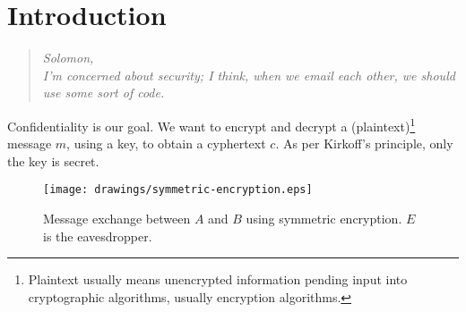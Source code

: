 \chapter{Introduction}

\begin{quote}
	\textit{Solomon,\\ I'm concerned about security; I think, when we email each other, we should use some sort of code.}
\end{quote}

Confidentiality is our goal.
We want to encrypt and decrypt a (plaintext)\footnote{Plaintext usually means unencrypted information pending input into cryptographic algorithms, usually encryption algorithms.} message $m$, using a key, to obtain a cyphertext $c$.
As per Kirkoff's principle, only the key is secret.

\begin{figure}[h]
	\centering
	\texttt{[image: drawings/symmetric-encryption.eps]}
	\caption{Message exchange between $A$ and $B$ using symmetric encryption. $E$ is the eavesdropper.}
	\label{fig:symmetric-encryption}
\end{figure}

